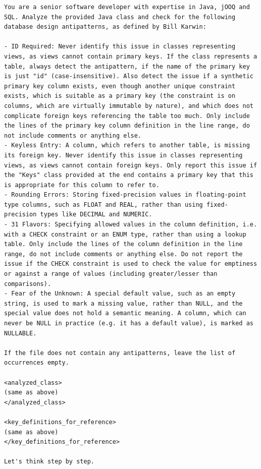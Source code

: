 \captionsetup{type=figure}
\begin{lstlisting}[frame=none, basicstyle=\small, breaklines=true, breakatwhitespace=false, breakindent=0pt]
You are a senior software developer with expertise in Java, jOOQ and SQL. Analyze the provided Java class and check for the following database design antipatterns, as defined by Bill Karwin:

- ID Required: Never identify this issue in classes representing views, as views cannot contain primary keys. If the class represents a table, always detect the antipattern, if the name of the primary key is just "id" (case-insensitive). Also detect the issue if a synthetic primary key column exists, even though another unique constraint exists, which is suitable as a primary key (the constraint is on columns, which are virtually immutable by nature), and which does not complicate foreign keys referencing the table too much. Only include the lines of the primary key column definition in the line range, do not include comments or anything else.
- Keyless Entry: A column, which refers to another table, is missing its foreign key. Never identify this issue in classes representing views, as views cannot contain foreign keys. Only report this issue if the "Keys" class provided at the end contains a primary key that this is appropriate for this column to refer to.
- Rounding Errors: Storing fixed-precision values in floating-point type columns, such as FLOAT and REAL, rather than using fixed-precision types like DECIMAL and NUMERIC.
- 31 Flavors: Specifying allowed values in the column definition, i.e. with a CHECK constraint or an ENUM type, rather than using a lookup table. Only include the lines of the column definition in the line range, do not include comments or anything else. Do not report the issue if the CHECK constraint is used to check the value for emptiness or against a range of values (including greater/lesser than comparisons).
- Fear of the Unknown: A special default value, such as an empty string, is used to mark a missing value, rather than NULL, and the special value does not hold a semantic meaning. A column, which can never be NULL in practice (e.g. it has a default value), is marked as NULLABLE.

If the file does not contain any antipatterns, leave the list of occurrences empty.

<analyzed_class>
(same as above)
</analyzed_class>

<key_definitions_for_reference>
(same as above)
</key_definitions_for_reference>

Let's think step by step.
\end{lstlisting}
\nopagebreak
\begin{minipage}{\linewidth}
\end{minipage}


